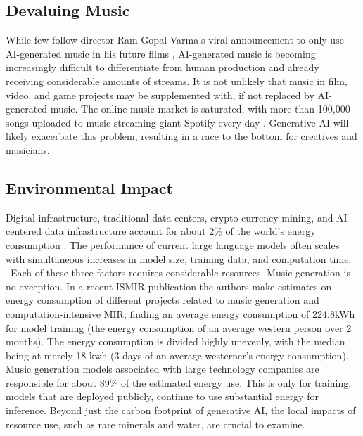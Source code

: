 \subsection{Devaluing Music}
While few follow director Ram Gopal Varma’s viral announcement to only use AI-generated music in his future films \cite{Singh_2024}, AI-generated music is becoming increasingly difficult to differentiate from human production and already receiving considerable amounts of streams. It is not unlikely that music in film, video, and game projects may be supplemented with, if not replaced by AI-generated music. The online music market is saturated, with more than 100,000 songs uploaded to music streaming giant Spotify every day \cite{Stassen_2023}. Generative AI will likely exacerbate this problem, resulting in a race to the bottom for creatives and musicians. 

\subsection{Environmental Impact}
Digital infrastructure, traditional data centers, crypto-currency mining, and AI-centered data infrastructure account for about 2\% of the world's energy consumption \cite{Marechal_2024}. The performance of current large language models often scales with simultaneous increases in model size, training data, and computation time.\cite{Kaplan_McCandlish_Henighan_Brown_Chess_Child_Gray_Radford_Wu_Amodei_2020}  Each of these three factors requires considerable resources. Music generation is no exception. In a recent ISMIR publication \cite{Holzapfel_Kaila_Jääskeläinen_2024} the authors make estimates on energy consumption of different projects related to music generation and computation-intensive MIR, finding an average energy consumption of 224.8kWh for model training (the energy consumption of an average western person over 2 months). The energy consumption is divided highly unevenly, with the median being at merely 18 kwh (3 days of an average westerner's energy consumption). Music generation models associated with large technology companies are responsible for about 89\% of the estimated energy use. This is only for training, models that are deployed publicly, continue to use substantial energy for inference. Beyond just the carbon footprint of generative AI, the local impacts of resource use, such as rare minerals and water, are crucial to examine. 

